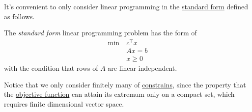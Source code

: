 It's convenient to only consider linear programming in the \hyperref[def:standard-form]{standard form} defined as follows.

\begin{definition}\label{def:standard-form}
	The \emph{standard form} linear programming problem has the form of
	\[
		\begin{aligned}
			\min~ & c^{\top}x \\
			      & Ax = b    \\
			      & x\geq 0
		\end{aligned}
	\]
	with the condition that rows of \(A\) are linear independent.
\end{definition}

\begin{remark}
	Notice that we only consider finitely many of \hyperref[def:constraints]{constrains}, since the property that the \hyperref[def:objective-function]{objective function}
	can attain its extremum only on a compact set, which requires finite dimensional vector space.
\end{remark}

